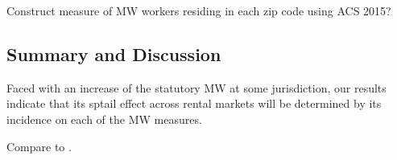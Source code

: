Construct measure of MW workers residing in each zip code using ACS 2015?

\subsection{Summary and Discussion}
\label{sec:results_discussion}

Faced with an increase of the statutory MW at some jurisdiction, our results
indicate that its sptail effect across rental markets will be determined by 
its incidence on each of the MW measures.


Compare to \textcite{Yamagishi2019}.
